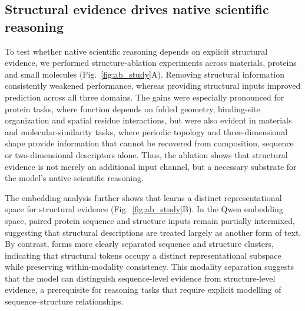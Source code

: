  
 
 

 
 

 
\subsection{Structural evidence drives native scientific reasoning}

 
 

 
 

 
 
 

 
 

To test whether native scientific reasoning depends on explicit structural evidence, we performed structure-ablation experiments across materials, proteins and small molecules (Fig.~\ref{fig:ab_study}A).
Removing structural information consistently weakened performance, whereas providing structural inputs improved prediction across all three domains.
The gains were especially pronounced for protein tasks, where function depends on folded geometry, binding-site organization and spatial residue interactions, but were also evident in materials and molecular-similarity tasks, where periodic topology and three-dimensional shape provide information that cannot be recovered from composition, sequence or two-dimensional descriptors alone.
Thus, the ablation shows that structural evidence is not merely an additional input channel, but a necessary substrate for the model's native scientific reasoning.

The embedding analysis further shows that \projName{} learns a distinct representational space for structural evidence (Fig.~\ref{fig:ab_study}B).
In the Qwen embedding space, paired protein sequence and structure inputs remain partially intermixed, suggesting that structural descriptions are treated largely as another form of text.
By contrast, \projName{} forms more clearly separated sequence and structure clusters, indicating that structural tokens occupy a distinct representational subspace while preserving within-modality consistency.
This modality separation suggests that the model can distinguish sequence-level evidence from structure-level evidence, a prerequisite for reasoning tasks that require explicit modelling of sequence--structure relationships.

